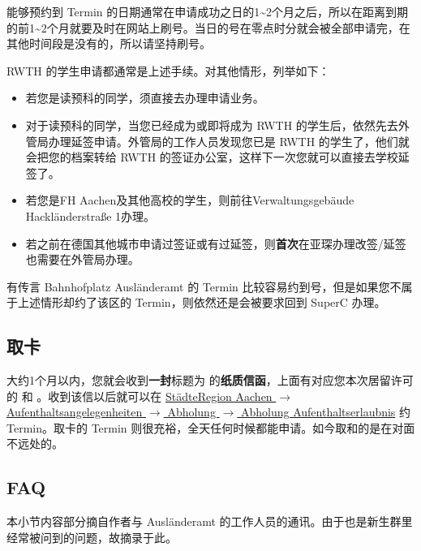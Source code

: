    能够预约到 Termin 的日期通常在申请成功之日的1\textasciitilde2个月之后，所以在距离到期的前1\textasciitilde2个月就要及时在网站上刷号。当日的号在零点时分就会被全部申请完，在其他时间段是没有的，所以请坚持刷号。

    RWTH 的学生申请都通常是上述手续。对其他情形，列举如下：

    \begin{itemize}
      \item 若您是读预科的同学，须直接去办理申请业务。
      \item 对于读预科的同学，当您已经成为或即将成为 RWTH 的学生后，依然先去外管局办理延签申请。外管局的工作人员发现您已是 RWTH 的学生了，他们就会把您的档案转给 RWTH 的签证办公室，这样下一次您就可以直接去学校延签了。
      \item 若您是FH Aachen及其他高校的学生，则前往Verwaltungsgebäude Hackländerstraße 1办理。
      \item 若之前在德国其他城市申请过签证或有过延签，则\textbf{首次}在亚琛办理改签/延签也需要在外管局办理。
    \end{itemize}
    有传言 Bahnhofplatz Ausländeramt 的 Termin 比较容易约到号，但是如果您不属于上述情形却约了该区的 Termin，则依然还是会被要求回到 SuperC 办理。

  \subsection{取卡}\label{subsec:取卡}

    大约1个月以内，您就会收到\textbf{一封}标题为  的\textbf{纸质信函}，上面有对应您本次居留许可的  和 。收到该信以后就可以在 \href{https://termine.staedteregion-aachen.de/auslaenderamt/}{StädteRegion Aachen $\rightarrow$ Aufenthaltsangelegenheiten $\rightarrow$  Abholung $\rightarrow$ Abholung Aufenthaltserlaubnis} 约 Termin。取卡的 Termin 则很充裕，全天任何时候都能申请。如今取和的是在对面不远处的。

  \subsection{FAQ}

    本小节内容部分摘自作者与 Ausländeramt 的工作人员的通讯。由于也是新生群里经常被问到的问题，故摘录于此。

